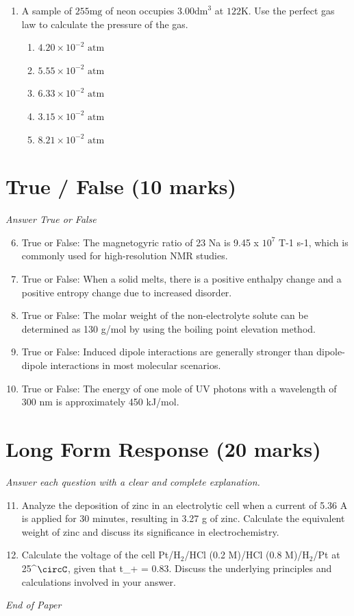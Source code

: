 \documentclass[12pt]{article}
\begin{document}
\begin{enumerate}[label=\arabic*.]
\begin{enumerate}[label=(\alph*)]
    \item 5.00 g O
    \item 3.10 g O
\end{enumerate}
\item A sample of $255 \mathrm{mg}$ of neon occupies $3.00 \mathrm{dm}^3$ at $122 \mathrm{K}$. Use the perfect gas law to calculate the pressure of the gas.
\begin{enumerate}[label=(\alph*)]
    \item $4.20 \times 10^{-2}$ $\text{atm}$
    \item $5.55 \times 10^{-2}$ $\text{atm}$
    \item $6.33 \times 10^{-2}$ $\text{atm}$
    \item $3.15 \times 10^{-2}$ $\text{atm}$
    \item $8.21 \times 10^{-2}$ $\text{atm}$
\end{enumerate}
\end{enumerate}

\section*{True / False (10 marks)}
\textit{Answer True or False}
\begin{enumerate}[label=\arabic*.]
\setcounter{enumi}{5}
\item True or False: The magnetogyric ratio of 23 Na is 9.45 x $10^7$ T-1 s-1, which is commonly used for high-resolution NMR studies.
\item True or False: When a solid melts, there is a positive enthalpy change and a positive entropy change due to increased disorder.
\item True or False: The molar weight of the non-electrolyte solute can be determined as 130 g/mol by using the boiling point elevation method.
\item True or False: Induced dipole interactions are generally stronger than dipole-dipole interactions in most molecular scenarios.
\item True or False: The energy of one mole of UV photons with a wavelength of 300 nm is approximately 450 kJ/mol.
\end{enumerate}

\section*{Long Form Response (20 marks)}
\textit{Answer each question with a clear and complete explanation.}
\begin{enumerate}[label=\arabic*.]
\setcounter{enumi}{10}
\item Analyze the deposition of zinc in an electrolytic cell when a current of 5.36 A is applied for 30 minutes, resulting in 3.27 g of zinc. Calculate the equivalent weight of zinc and discuss its significance in electrochemistry.
\item Calculate the voltage of the cell Pt/H$_{2}$/HCl (0.2 M)/HCl (0.8 M)/H$_{2}$/Pt at 25^\ensuremath{\circC}, given that t\_+ = 0.83. Discuss the underlying principles and calculations involved in your answer.
\end{enumerate}

\vfill
\noindent\textit{End of Paper}
\end{document}
